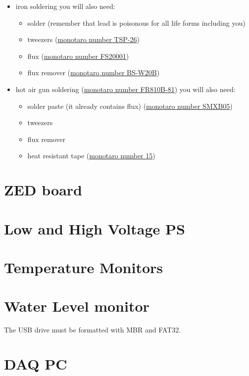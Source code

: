 \begin{itemize}
\item iron soldering you will also need:
  \begin{itemize}
  \item solder (remember that lead is poisonous for all life forms including
    you)
  \item tweezers
    (\href{https://www.monotaro.com/p/0840/4873/?displayId=5}{monotaro number
      TSP-26})
  \item flux (\href{https://www.monotaro.com/p/3952/8833/?displayId=5}{monotaro
      number FS20001})
  \item flux remover
    (\href{https://www.monotaro.com/p/6215/1382/?displayId=5}{monotaro number
      BS-W20B})
  \end{itemize}
\item hot air gun soldering
  (\href{https://www.monotaro.com/p/4893/0954/?displayId=5}{monotaro number
    FR810B-81}) you will also need:
  \begin{itemize}
  \item solder paste (it already contains flux)
    (\href{https://www.monotaro.com/p/1001/3097/?displayId=5}{monotaro number
      SMXB05})
  \item tweezers
  \item flux remover
  \item heat resistant tape
    (\href{https://www.monotaro.com/p/5638/8526/?displayId=5}{monotaro number
      15})
  \end{itemize}
\end{itemize}

\section{ZED board}
\section{Low and High Voltage PS}
\section{Temperature Monitors}
\section{Water Level monitor}
The USB drive must be formatted with MBR and FAT32.
\section{DAQ PC}

